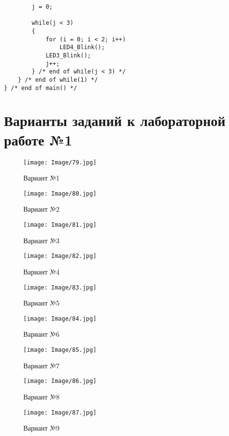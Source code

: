 \begin{verbatim}
        j = 0;

        while(j < 3)
        {
            for (i = 0; i < 2; i++)
                LED4_Blink();
            LED3_Blink();
            j++;
        } /* end of while(j < 3) */
    } /* end of while(1) */
} /* end of main() */
\end{verbatim}

\section{Варианты заданий к лабораторной работе №1}
\label{Lab1Var}
\begin{figure}[H]
\begin{center}
\texttt{[image: Image/79.jpg]} 
\end{center}
\caption{Вариант №1}
\end{figure}
\begin{figure}[H]
\begin{center}
\texttt{[image: Image/80.jpg]} 
\end{center}
\caption{Вариант №2}
\end{figure}
\begin{figure}[H]
\begin{center}
\texttt{[image: Image/81.jpg]} 
\end{center}
\caption{Вариант №3}
\end{figure}
\begin{figure}[H]
\begin{center}
\texttt{[image: Image/82.jpg]} 
\end{center}
\caption{Вариант №4}
\end{figure}
\begin{figure}[H]
\begin{center}
\texttt{[image: Image/83.jpg]} 
\end{center}
\caption{Вариант №5}
\end{figure}
\begin{figure}[H]
\begin{center}
\texttt{[image: Image/84.jpg]} 
\end{center}
\caption{Вариант №6}
\end{figure}
\begin{figure}[H]
\begin{center}
\texttt{[image: Image/85.jpg]} 
\end{center}
\caption{Вариант №7}
\end{figure}
\begin{figure}[H]
\begin{center}
\texttt{[image: Image/86.jpg]} 
\end{center}
\caption{Вариант №8}
\end{figure}
\begin{figure}[H]
\begin{center}
\texttt{[image: Image/87.jpg]} 
\end{center}
\caption{Вариант №9}
\end{figure}